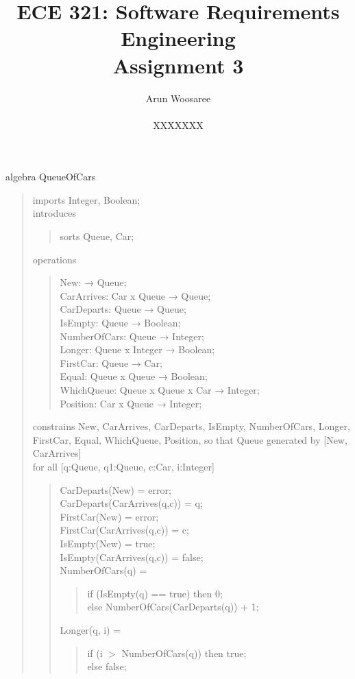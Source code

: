 \documentclass[letterpaper,12pt]{article}
\title{ECE 321: Software Requirements Engineering \\ Assignment 3}
\author{Arun Woosaree \\ \\ XXXXXXX}
\begin{document}
\maketitle

algebra QueueOfCars
\begin{quote}
 imports Integer, Boolean;\\
 introduces
 \begin{quote}
  sorts Queue, Car;
 \end{quote}
 operations
 \begin{quote}
  New: → Queue;\\
  CarArrives: Car x Queue → Queue;\\
  CarDeparts: Queue → Queue;\\
  IsEmpty: Queue → Boolean;\\
  NumberOfCars: Queue → Integer;\\
  Longer: Queue x Integer → Boolean;\\
  FirstCar: Queue → Car;\\
  Equal: Queue x Queue → Boolean;\\
  WhichQueue: Queue x Queue x Car → Integer;\\
  Position: Car x Queue → Integer;
 \end{quote}
 constrains New, CarArrives, CarDeparts, IsEmpty, NumberOfCars, Longer, FirstCar, Equal, WhichQueue, Position, so that Queue generated by [New, CarArrives]\\
 
 \newpage
 for all [q:Queue, q1:Queue, c:Car, i:Integer]
 \begin{quote}
  CarDeparts(New) = error;\\
  CarDeparts(CarArrives(q,c)) = q;\\
  FirstCar(New) = error;\\
  FirstCar(CarArrives(q,c)) = c;\\
  IsEmpty(New) = true;\\
  IsEmpty(CarArrives(q,c)) = false;\\
  NumberOfCars(q) =
  \begin{quote}
   if (IsEmpty(q) == true) then 0;\\
   else NumberOfCars(CarDeparts(q)) + 1;
  \end{quote}
  Longer(q, i) =
  \begin{quote}
   if (i $>$ NumberOfCars(q)) then true;\\
   else false;
  \end{quote}
  

\end{quote}
\end{quote}
\end{document}

